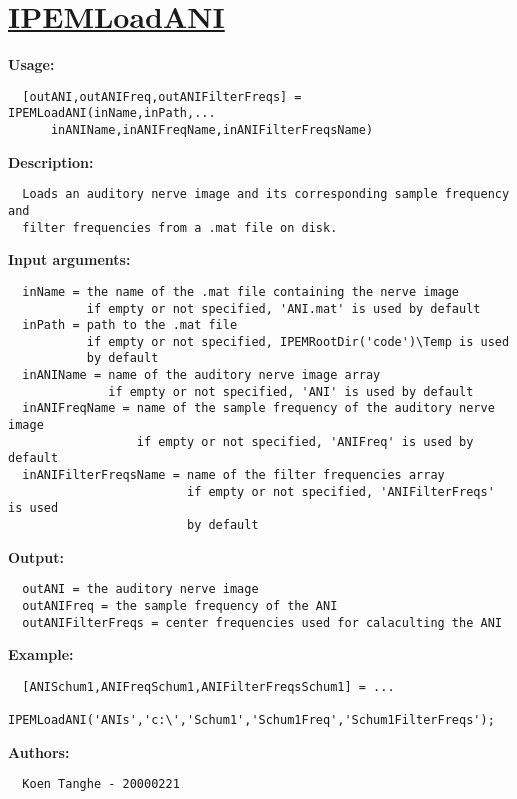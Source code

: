 \newpage
\section*{\hyperlink{Concepts:IPEMLoadANI}{IPEMLoadANI}}
\hypertarget{FuncRef:IPEMLoadANI}{}

\textbf{Usage:}
\begin{verbatim}  [outANI,outANIFreq,outANIFilterFreqs] = IPEMLoadANI(inName,inPath,...
      inANIName,inANIFreqName,inANIFilterFreqsName)

\end{verbatim}
\textbf{Description:}
\begin{verbatim}  Loads an auditory nerve image and its corresponding sample frequency and
  filter frequencies from a .mat file on disk.

\end{verbatim}
\textbf{Input arguments:}
\begin{verbatim}  inName = the name of the .mat file containing the nerve image
           if empty or not specified, 'ANI.mat' is used by default
  inPath = path to the .mat file
           if empty or not specified, IPEMRootDir('code')\Temp is used
           by default
  inANIName = name of the auditory nerve image array
              if empty or not specified, 'ANI' is used by default
  inANIFreqName = name of the sample frequency of the auditory nerve image
                  if empty or not specified, 'ANIFreq' is used by default
  inANIFilterFreqsName = name of the filter frequencies array
                         if empty or not specified, 'ANIFilterFreqs' is used
                         by default

\end{verbatim}
\textbf{Output:}
\begin{verbatim}  outANI = the auditory nerve image
  outANIFreq = the sample frequency of the ANI
  outANIFilterFreqs = center frequencies used for calaculting the ANI

\end{verbatim}
\textbf{Example:}
\begin{verbatim}  [ANISchum1,ANIFreqSchum1,ANIFilterFreqsSchum1] = ...
    IPEMLoadANI('ANIs','c:\','Schum1','Schum1Freq','Schum1FilterFreqs');

\end{verbatim}
\textbf{Authors:}
\begin{verbatim}  Koen Tanghe - 20000221
\end{verbatim}


